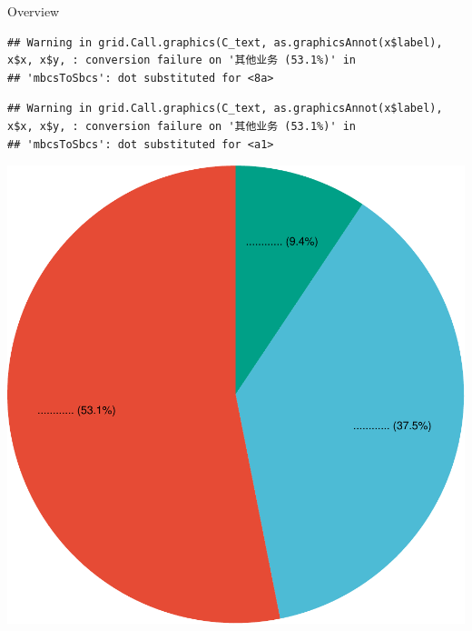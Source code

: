 \documentclass[
  5pt,
  ignorenonframetext,
]{beamer}
\begin{document}
\begin{frame}[fragile]{Overview}
\begin{verbatim}
## Warning in grid.Call.graphics(C_text, as.graphicsAnnot(x$label), x$x, x$y, : conversion failure on '其他业务 (53.1%)' in
## 'mbcsToSbcs': dot substituted for <8a>
\end{verbatim}

\begin{verbatim}
## Warning in grid.Call.graphics(C_text, as.graphicsAnnot(x$label), x$x, x$y, : conversion failure on '其他业务 (53.1%)' in
## 'mbcsToSbcs': dot substituted for <a1>
\end{verbatim}

\includegraphics{slidy_6_year_files/figure-beamer/unnamed-chunk-2-1.pdf}
\end{frame}
\end{document}
